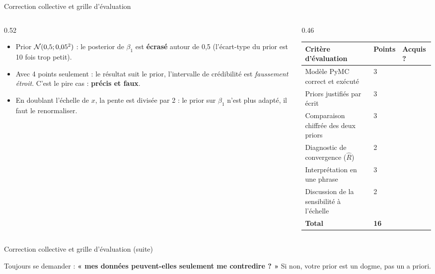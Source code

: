 \begin{frame}{Correction collective et grille d'évaluation}
\begin{columns}[t]
\begin{column}{0.52\textwidth}
\begin{solbox}
\begin{itemize}
  \item Prior $\mathcal{N}(0{,}5; 0{,}05^2)$ : le posterior de $\beta_1$ est
        \textbf{écrasé} autour de 0,5 (l'écart-type du prior est 10 fois trop petit).
  \item Avec 4 points seulement : le résultat suit le prior, l'intervalle de
        crédibilité est \emph{faussement étroit}. C'est le pire cas :
        \textbf{précis et faux}.
  \item En doublant l'échelle de $x$, la pente est divisée par 2 :
        le prior sur $\beta_1$ n'est plus adapté, il faut le renormaliser.
\end{itemize}
\end{solbox}
\end{column}
\begin{column}{0.46\textwidth}
{\setlength{\tabcolsep}{3pt}\begin{tabular}{@{}p{3.3cm}p{0.8cm}p{1.3cm}@{}}
\toprule
Critère d'évaluation & Points & Acquis ? \\
\midrule
Modèle PyMC correct et exécuté & 3 & \hspace{1.2cm} \\
Priors justifiés par écrit & 3 & \\
Comparaison chiffrée des deux priors & 3 & \\
Diagnostic de convergence ($\hat R$) & 2 & \\
Interprétation en une phrase & 3 & \\
Discussion de la sensibilité à l'échelle & 2 & \\
\midrule
\textbf{Total} & \textbf{16} & \\
\bottomrule
\end{tabular}}
\end{column}
\end{columns}
\vspace{1.5mm}
\end{frame}

\begin{frame}{Correction collective et grille d'évaluation (suite)}
\begin{wbox}
Toujours se demander : \textbf{« mes données peuvent-elles seulement me contredire ? »}
Si non, votre prior est un dogme, pas un a priori.
\end{wbox}
\end{frame}

